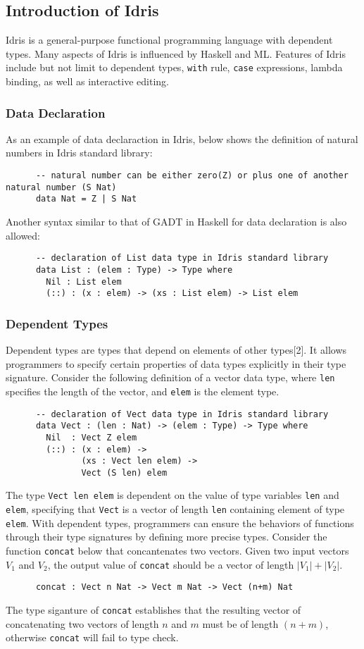 
\subsection{Introduction of Idris}
Idris is a general-purpose functional programming language with dependent types. Many aspects of Idris is influenced by Haskell and ML. Features of Idris include but not limit to dependent types, \texttt{with} rule, \texttt{case} expressions, lambda binding, as well as interactive editing. 

\subsubsection*{Data Declaration}
As an example of data declaraction in Idris, below shows the definition of natural numbers in Idris standard library: 
\begin{lstlisting}
      -- natural number can be either zero(Z) or plus one of another natural number (S Nat)
      data Nat = Z | S Nat
\end{lstlisting}
Another syntax similar to that of GADT in Haskell for data declaration is also allowed: 
\begin{lstlisting}
      -- declaration of List data type in Idris standard library
      data List : (elem : Type) -> Type where
        Nil : List elem
        (::) : (x : elem) -> (xs : List elem) -> List elem
\end{lstlisting}

\subsubsection*{Dependent Types}
Dependent types are types that depend on elements of other types[2]. It allows programmers to specify certain properties of data types explicitly in their type signature. Consider the following definition of a vector data type, where \texttt{len} specifies the length of the vector, and \texttt{elem} is the element type. 
\begin{lstlisting}
      -- declaration of Vect data type in Idris standard library
      data Vect : (len : Nat) -> (elem : Type) -> Type where
        Nil  : Vect Z elem
        (::) : (x : elem) -> 
               (xs : Vect len elem) -> 
               Vect (S len) elem
\end{lstlisting}
The type \texttt{Vect len elem} is dependent on the value of type variables \texttt{len} and \texttt{elem}, specifying that \texttt{Vect} is a vector of length \texttt{len} containing element of type \texttt{elem}. With dependent types, programmers can ensure the behaviors of functions through their type signatures by defining more precise types. Consider the function \texttt{concat} below that concantenates two vectors. Given two input vectors $V_1$ and $V_2$, the output value of \texttt{concat} should be a vector of length $|V_1| + |V_2|$.  
\begin{lstlisting}
      concat : Vect n Nat -> Vect m Nat -> Vect (n+m) Nat
\end{lstlisting}
The type siganture of \texttt{concat} establishes that the resulting vector of concatenating two vectors of length $n$ and $m$ must be of length $(n+m)$, otherwise \texttt{concat} will fail to type check. 


